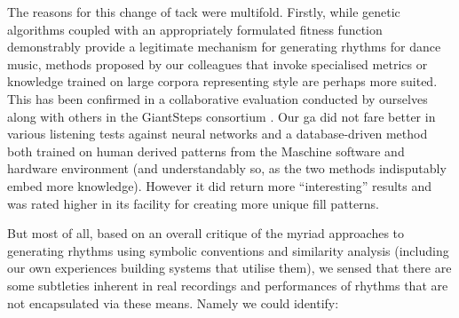 {{The reasons for this change of tack were multifold. Firstly, while genetic algorithms coupled with an appropriately formulated fitness function demonstrably provide a legitimate mechanism for generating rhythms for dance music, methods proposed by our colleagues that invoke specialised metrics \citep{Marin2015} or knowledge trained on large corpora representing style \citep{Jorda2016} are perhaps more suited. This has been confirmed in a collaborative evaluation conducted by ourselves along with others in the GiantSteps consortium \citep{Vogl2016}. Our \acrshort{ga} did not fare better in various listening tests against neural networks and a database-driven method both trained on human derived patterns from the Maschine software and hardware environment (and understandably so, as the two methods indisputably embed more knowledge). However it did return more ``interesting'' results and was rated higher in its facility for creating more unique fill patterns. 

%

But most of all, based on an overall critique of the myriad approaches to generating rhythms using symbolic conventions and similarity analysis (including our own experiences building systems that utilise them), we sensed that there are some subtleties inherent in real recordings and performances of rhythms that are not encapsulated via these means. Namely we could identify:

}}
